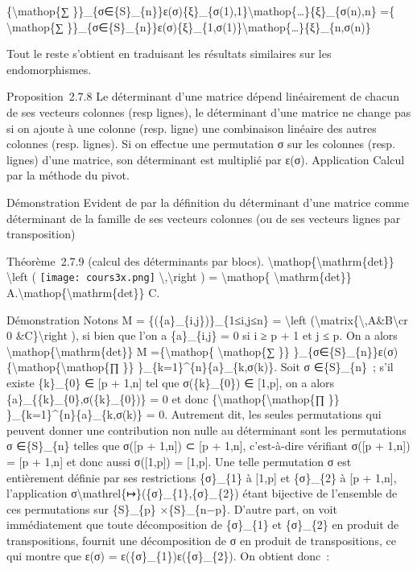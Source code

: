 \documentclass[]{article}
\begin{document}
\{\textbackslash{}mathop\{∑
\}\}\_\{σ∈\{S\}\_\{n\}\}ε(σ)\{ξ\}\_\{σ(1),1\}\textbackslash{}mathop\{\ldots{}\}\{ξ\}\_\{σ(n),n\}
=\{ \textbackslash{}mathop\{∑
\}\}\_\{σ∈\{S\}\_\{n\}\}ε(σ)\{ξ\}\_\{1,σ(1)\}\textbackslash{}mathop\{\ldots{}\}\{ξ\}\_\{n,σ(n)\}

Tout le reste s'obtient en traduisant les résultats similaires sur les
endomorphismes.

Proposition~2.7.8 Le déterminant d'une matrice dépend linéairement de
chacun de ses vecteurs colonnes (resp lignes), le déterminant d'une
matrice ne change pas si on ajoute à une colonne (resp. ligne) une
combinaison linéaire des autres colonnes (resp. lignes). Si on effectue
une permutation σ sur les colonnes (resp. lignes) d'une matrice, son
déterminant est multiplié par ε(σ). Application Calcul par la méthode du
pivot.

Démonstration Evident de par la définition du déterminant d'une matrice
comme déterminant de la famille de ses vecteurs colonnes (ou de ses
vecteurs lignes par transposition)

Théorème~2.7.9 (calcul des déterminants par blocs).
\textbackslash{}mathop\{\textbackslash{}mathrm\{det\}\}
\textbackslash{}left ( \texttt{[image: cours3x.png]}
\textbackslash{},\textbackslash{}right ) = \textbackslash{}mathop\{
\textbackslash{}mathrm\{det\}\}
A.\textbackslash{}mathop\{\textbackslash{}mathrm\{det\}\} C.

Démonstration Notons M = \{(\{a\}\_\{i,j\})\}\_\{1≤i,j≤n\} =
\textbackslash{}left
(\textbackslash{}matrix\{\textbackslash{},A\&B\textbackslash{}cr 0
\&C\}\textbackslash{}right ), si bien que l'on a \{a\}\_\{i,j\} = 0 si i
≥ p + 1 et j ≤ p. On a alors
\textbackslash{}mathop\{\textbackslash{}mathrm\{det\}\} M
=\{\textbackslash{}mathop\{ \textbackslash{}mathop\{∑ \}\}
\}\_\{σ∈\{S\}\_\{n\}\}ε(σ)\{\textbackslash{}mathop\{\textbackslash{}mathop\{∏
\}\} \}\_\{k=1\}\^{}\{n\}\{a\}\_\{k,σ(k)\}. Soit σ ∈\{S\}\_\{n\}~; s'il
existe \{k\}\_\{0\} ∈ {[}p + 1,n{]} tel que σ(\{k\}\_\{0\}) ∈ {[}1,p{]},
on a alors \{a\}\_\{\{k\}\_\{0\},σ(\{k\}\_\{0\})\} = 0 et donc
\{\textbackslash{}mathop\{\textbackslash{}mathop\{∏ \}\}
\}\_\{k=1\}\^{}\{n\}\{a\}\_\{k,σ(k)\} = 0. Autrement dit, les seules
permutations qui peuvent donner une contribution non nulle au
déterminant sont les permutations σ ∈\{S\}\_\{n\} telles que σ({[}p +
1,n{]}) ⊂ {[}p + 1,n{]}, c'est-à-dire vérifiant σ({[}p + 1,n{]}) = {[}p
+ 1,n{]} et donc aussi σ({[}1,p{]}) = {[}1,p{]}. Une telle permutation σ
est entièrement définie par ses restrictions \{σ\}\_\{1\} à {[}1,p{]} et
\{σ\}\_\{2\} à {[}p + 1,n{]}, l'application
σ\textbackslash{}mathrel\{↦\}(\{σ\}\_\{1\},\{σ\}\_\{2\}) étant bijective
de l'ensemble de ces permutations sur \{S\}\_\{p\} ×\{S\}\_\{n−p\}.
D'autre part, on voit immédiatement que toute décomposition de
\{σ\}\_\{1\} et \{σ\}\_\{2\} en produit de transpositions, fournit une
décomposition de σ en produit de transpositions, ce qui montre que ε(σ)
= ε(\{σ\}\_\{1\})ε(\{σ\}\_\{2\}). On obtient donc~:
\end{document}
